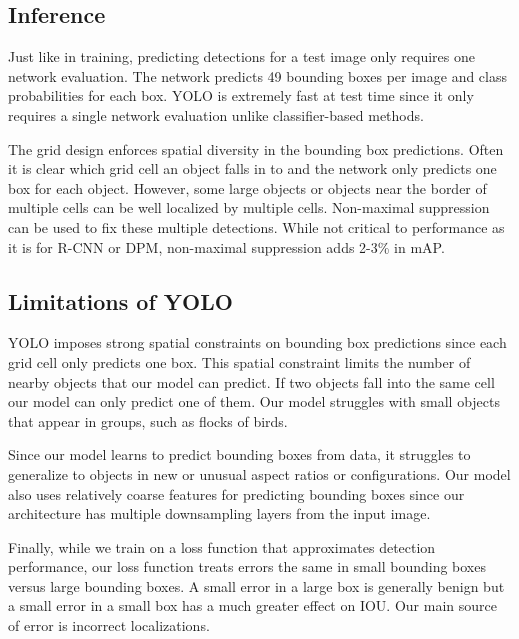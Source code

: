 \documentclass{article} %
\begin{document}
\subsection{Inference}

Just like in training, predicting detections for a test image only requires one network evaluation. The network predicts 49 bounding boxes per image and class probabilities for each box. YOLO is extremely fast at test time since it only requires a single network evaluation unlike classifier-based methods.

The grid design enforces spatial diversity in the bounding box predictions. Often it is clear which grid cell an object falls in to and the network only predicts one box for each object. However, some large objects or objects near the border of multiple cells can be well localized by multiple cells. Non-maximal suppression can be used to fix these multiple detections. While not critical to performance as it is for R-CNN or DPM, non-maximal suppression adds 2-3\% in mAP.

\subsection{Limitations of YOLO}

YOLO imposes strong spatial constraints on bounding box predictions since each grid cell only predicts one box. This spatial constraint limits the number of nearby objects that our model can predict. If two objects fall into the same cell our model can only predict one of them. Our model struggles with small objects that appear in groups, such as flocks of birds.

Since our model learns to predict bounding boxes from data, it struggles to generalize to objects in new or unusual aspect ratios or configurations. Our model also uses relatively coarse features for predicting bounding boxes since our architecture has multiple downsampling layers from the input image.

Finally, while we train on a loss function that approximates detection performance, our loss function treats errors the same in small bounding boxes versus large bounding boxes. A small error in a large box is generally benign but a small error in a small box has a much greater effect on IOU. Our main source of error is incorrect localizations.
\end{document}
